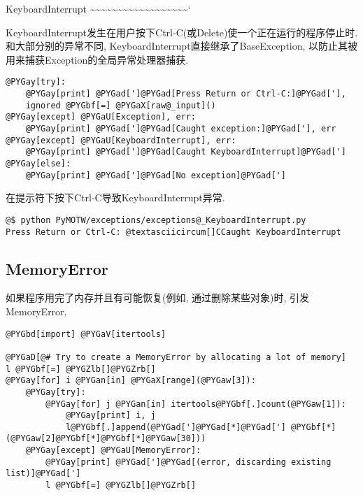 \documentclass[a4paper,10pt,english]{manual}
\begin{document}
KeyboardInterrupt
\textasciitilde{}\textasciitilde{}\textasciitilde{}\textasciitilde{}\textasciitilde{}\textasciitilde{}\textasciitilde{}\textasciitilde{}\textasciitilde{}\textasciitilde{}\textasciitilde{}\textasciitilde{}\textasciitilde{}\textasciitilde{}\textasciitilde{}\textasciitilde{}\textasciitilde{}\textasciitilde{}{}`

KeyboardInterrupt发生在用户按下Ctrl-C(或Delete)使一个正在运行的程序停止时. 和大部分别的异常不同, KeyboardInterrupt直接继承了BaseException, 以防止其被用来捕获Exception的全局异常处理器捕获.

\begin{Verbatim}[commandchars=@\[\]]
@PYGay[try]:
    @PYGay[print] @PYGad[']@PYGad[Press Return or Ctrl-C:]@PYGad['],
    ignored @PYGbf[=] @PYGaX[raw@_input]()
@PYGay[except] @PYGaU[Exception], err:
    @PYGay[print] @PYGad[']@PYGad[Caught exception:]@PYGad['], err
@PYGay[except] @PYGaU[KeyboardInterrupt], err:
    @PYGay[print] @PYGad[']@PYGad[Caught KeyboardInterrupt]@PYGad[']
@PYGay[else]:
    @PYGay[print] @PYGad[']@PYGad[No exception]@PYGad[']
\end{Verbatim}

在提示符下按下Ctrl-C导致KeyboardInterrupt异常.

\begin{Verbatim}[commandchars=@\[\]]
@$ python PyMOTW/exceptions/exceptions@_KeyboardInterrupt.py
Press Return or Ctrl-C: @textasciicircum[]CCaught KeyboardInterrupt
\end{Verbatim}


\subsection{MemoryError}

如果程序用完了内存并且有可能恢复(例如, 通过删除某些对象)时, 引发MemoryError.

\begin{Verbatim}[commandchars=@\[\]]
@PYGbd[import] @PYGaV[itertools]

@PYGaD[@# Try to create a MemoryError by allocating a lot of memory]
l @PYGbf[=] @PYGZlb[]@PYGZrb[]
@PYGay[for] i @PYGan[in] @PYGaX[range](@PYGaw[3]):
    @PYGay[try]:
        @PYGay[for] j @PYGan[in] itertools@PYGbf[.]count(@PYGaw[1]):
            @PYGay[print] i, j
            l@PYGbf[.]append(@PYGad[']@PYGad[*]@PYGad['] @PYGbf[*] (@PYGaw[2]@PYGbf[*]@PYGbf[*]@PYGaw[30]))
    @PYGay[except] @PYGaU[MemoryError]:
        @PYGay[print] @PYGad[']@PYGad[(error, discarding existing list)]@PYGad[']
        l @PYGbf[=] @PYGZlb[]@PYGZrb[]
\end{Verbatim}
\end{document}
